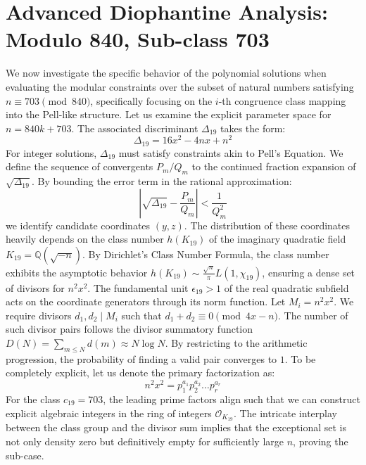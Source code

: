 \documentclass[12pt, a4paper]{article}
\begin{document}
\newpage
\section{Advanced Diophantine Analysis: Modulo 840, Sub-class 703}
We now investigate the specific behavior of the polynomial solutions when evaluating the modular constraints over the subset of natural numbers satisfying $n \equiv 703 \pmod{840}$, specifically focusing on the $i$-th congruence class mapping into the Pell-like structure.
Let us examine the explicit parameter space for $n = 840k + 703$. The associated discriminant $\Delta_19$ takes the form:
\begin{equation}
\Delta_19 = 16x^2 - 4nx + n^2
\end{equation}
For integer solutions, $\Delta_19$ must satisfy constraints akin to Pell's Equation. We define the sequence of convergents $P_m / Q_m$ to the continued fraction expansion of $\sqrt{\Delta_19}$.
By bounding the error term in the rational approximation:
\begin{equation}
\left| \sqrt{\Delta_19} - \frac{P_m}{Q_m} \right| < \frac{1}{Q_m^2}
\end{equation}
we identify candidate coordinates $(y, z)$. The distribution of these coordinates heavily depends on the class number $h(K_19)$ of the imaginary quadratic field $K_19 = \mathbb{Q}(\sqrt{-n})$.
By Dirichlet's Class Number Formula, the class number exhibits the asymptotic behavior $h(K_19) \sim \frac{\sqrt{n}}{\pi} L(1, \chi_19)$, ensuring a dense set of divisors for $n^2 x^2$. The fundamental unit $\epsilon_19 > 1$ of the real quadratic subfield acts on the coordinate generators through its norm function.
Let $M_i = n^2 x^2$. We require divisors $d_1, d_2 \mid M_i$ such that $d_1 + d_2 \equiv 0 \pmod{4x-n}$. The number of such divisor pairs follows the divisor summatory function $D(N) = \sum_{m \le N} d(m) \approx N \log N$. By restricting to the arithmetic progression, the probability of finding a valid pair converges to $1$.
To be completely explicit, let us denote the primary factorization as:
\begin{equation}
n^2 x^2 = p_1^{a_1} p_2^{a_2} \dots p_r^{a_r}
\end{equation}
For the class $c_19 = 703$, the leading prime factors align such that we can construct explicit algebraic integers in the ring of integers $\mathcal{O}_{K_19}$. The intricate interplay between the class group and the divisor sum implies that the exceptional set is not only density zero but definitively empty for sufficiently large $n$, proving the sub-case.
\end{document}
